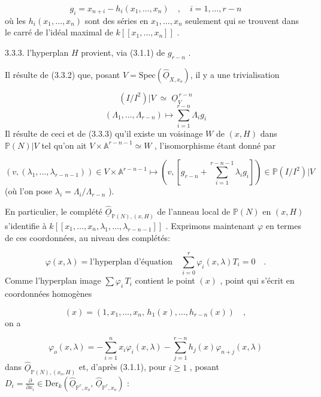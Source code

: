 \begin{equation*}
g_i = x_{n+i} - h_i(x_1,\dots,x_n) \quad , \quad i = 1,\dots,r-n
\end{equation*}
où les $h_i(x_1,\dots,x_n)$ sont des séries en $x_1,\dots,x_n$ seulement qui se trouvent dans le carré de l'idéal maximal de $k[[x_1,\dots,x_n]]$ .

3.3.3.  l'hyperplan $H$ provient, via (3.1.1) de $g_{r-n}$ .

Il résulte de (3.3.2) que, posant $V = \mathrm{Spec}(\hat{\underline{O}}_{X,x_o})$, il y a une trivialisation

\begin{equation*}
(I/I^2)|V \;\simeq\; \underline{O}_V^{\,r-n}
\end{equation*}
\begin{equation}\tag{3.3.4}
(\Lambda_1,\dots,\Lambda_{r-n}) \longmapsto
\sum_{i=1}^{r-n}\Lambda_i g_i
\end{equation}
Il résulte de ceci et de (3.3.3) qu'il existe un voisinage $W$ de $(x, H)$
dans $\mathbb{P}(N)|V$ tel qu'on ait $V \times \mathbb{A}^{r-n-1} \simeq W$ , l'isomorphisme étant donné par

\begin{equation}\tag{3.3.5}
(v,(\lambda_1,\dots,\lambda_{r-n-1})) \in
V\times\mathbb{A}^{r-n-1} \longmapsto
\left(v,\left[g_{r-n}+\sum_{i=1}^{r-n-1}\lambda_i g_i\right]\right)
\in \mathbb{P}(I/I^2)|V
\end{equation}
(où l'on pose $\lambda_i = \Lambda_i/\Lambda_{r-n}$ ).

En particulier, le complété $\hat{\underline{O}}_{\mathbb{P}(N),(x,H)}$ de l'anneau local de $\mathbb{P}(N)$ en $(x, H)$ s'identifie à $k[[x_1,\dots,x_n,\lambda_1,\dots,\lambda_{r-n-1}]]$ . Exprimons maintenant $\varphi$ en termes de ces coordonnées, au niveau des complétés:

\begin{equation}\tag{3.3.6}
\varphi(x,\lambda)
= \mbox{l'hyperplan d'équation} \quad
\sum_{i=0}^{r}\varphi_i(x,\lambda)T_i=0 \quad .
\end{equation}
Comme l'hyperplan image $\sum \varphi_i\, T_i$ contient le point $(x)$ , point qui s'écrit en coordonnées homogènes

\begin{equation}\tag{3.3.7}
(x) = (1,x_1,\dots,x_n,\, h_1(x),\dots,h_{r-n}(x)) \quad ,
\end{equation}
on a

\begin{equation}\tag{3.3.8}
\varphi_o(x,\lambda)= - \sum_{i=1}^{n} x_i\varphi_i(x,\lambda)- \sum_{j=1}^{r-n} h_j(x)\varphi_{n+j}(x,\lambda)
\end{equation}
dans $\hat{\underline{O}}_{\mathbb{P}(N),(x_o,H)}$ et, d'après (3.1.1), pour $i \geq 1$ , posant $D_i = \frac{\partial}{\partial x_i} \in \mathrm{Der}_k(\hat{\underline{O}}_{\mathbb{P}^r,x_o},\, \hat{\underline{O}}_{\mathbb{P}^r,x_o})$ :

